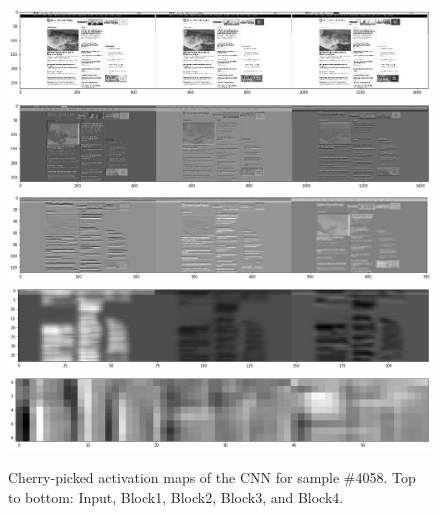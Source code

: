 \begin{figure}[h]
    \centering
    \includegraphics[clip,width=\columnwidth]{resources/analysis/feat-map-4058-0.png}\\
    \includegraphics[clip,width=\columnwidth]{resources/analysis/feat-map-4058-1.png}\\
    \includegraphics[clip,width=\columnwidth]{resources/analysis/feat-map-4058-2.png}\\
    \includegraphics[clip,width=\columnwidth]{resources/analysis/feat-map-4058-3.png}\\
    \includegraphics[clip,width=\columnwidth]{resources/analysis/feat-map-4058-4.png}\\
    \caption[Activation maps of the CNN for sample \#4058]{Cherry-picked activation maps of the CNN for sample \#4058. Top to bottom: Input, Block1, Block2, Block3, and Block4.}
    \label{fig:activationmaps2}
\end{figure}

